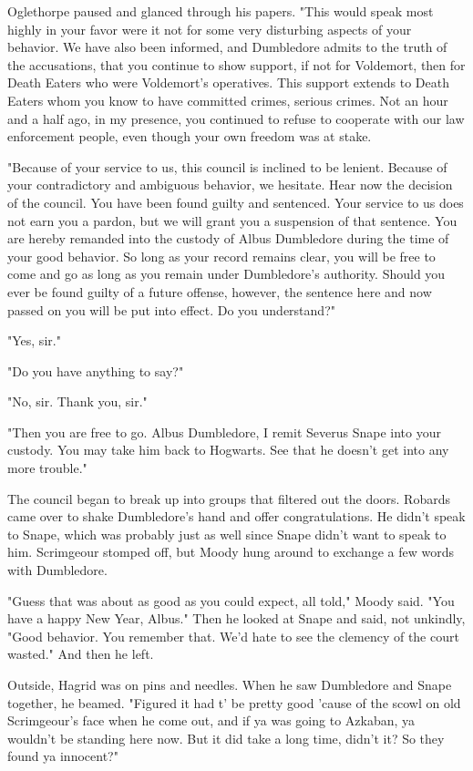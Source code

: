 Oglethorpe paused and glanced through his papers. "This would speak most highly in your favor were it not for some very disturbing aspects of your behavior. We have also been informed, and Dumbledore admits to the truth of the accusations, that you continue to show support, if not for Voldemort, then for Death Eaters who were Voldemort's operatives. This support extends to Death Eaters whom you know to have committed crimes, serious crimes. Not an hour and a half ago, in my presence, you continued to refuse to cooperate with our law enforcement people, even though your own freedom was at stake.

"Because of your service to us, this council is inclined to be lenient. Because of your contradictory and ambiguous behavior, we hesitate. Hear now the decision of the council. You have been found guilty and sentenced. Your service to us does not earn you a pardon, but we will grant you a suspension of that sentence. You are hereby remanded into the custody of Albus Dumbledore during the time of your good behavior. So long as your record remains clear, you will be free to come and go as long as you remain under Dumbledore's authority. Should you ever be found guilty of a future offense, however, the sentence here and now passed on you will be put into effect. Do you understand?"

"Yes, sir."

"Do you have anything to say?"

"No, sir. Thank you, sir."

"Then you are free to go. Albus Dumbledore, I remit Severus Snape into your custody. You may take him back to Hogwarts. See that he doesn't get into any more trouble."

The council began to break up into groups that filtered out the doors. Robards came over to shake Dumbledore's hand and offer congratulations. He didn't speak to Snape, which was probably just as well since Snape didn't want to speak to him. Scrimgeour stomped off, but Moody hung around to exchange a few words with Dumbledore.

"Guess that was about as good as you could expect, all told," Moody said. "You have a happy New Year, Albus." Then he looked at Snape and said, not unkindly, "Good behavior. You remember that. We'd hate to see the clemency of the court wasted." And then he left.

Outside, Hagrid was on pins and needles. When he saw Dumbledore and Snape together, he beamed. "Figured it had t' be pretty good 'cause of the scowl on old Scrimgeour's face when he come out, and if ya was going to Azkaban, ya wouldn't be standing here now. But it did take a long time, didn't it? So they found ya innocent?"

